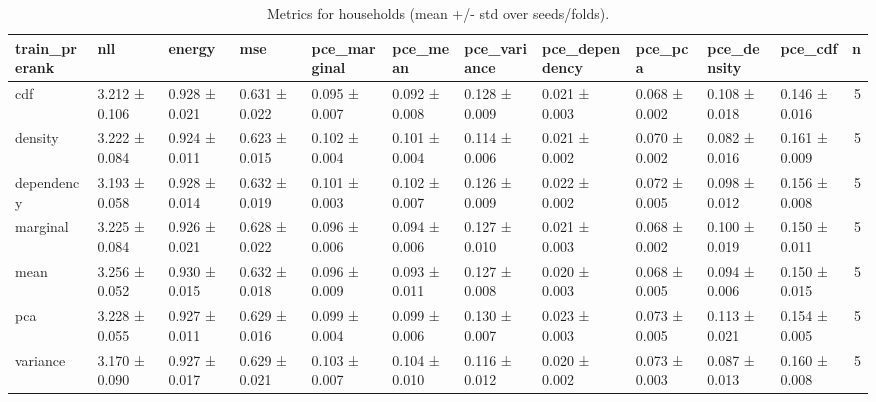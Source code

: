 \begin{table}
\caption{Metrics for households (mean +/- std over seeds/folds).}
\label{tab:metrics_summary_households}
\begin{tabular}{lllllllllllr}
\toprule
train_prerank & nll & energy & mse & pce_marginal & pce_mean & pce_variance & pce_dependency & pce_pca & pce_density & pce_cdf & n \\
\midrule
cdf & 3.212 ± 0.106 & 0.928 ± 0.021 & 0.631 ± 0.022 & 0.095 ± 0.007 & 0.092 ± 0.008 & 0.128 ± 0.009 & 0.021 ± 0.003 & 0.068 ± 0.002 & 0.108 ± 0.018 & 0.146 ± 0.016 & 5 \\
density & 3.222 ± 0.084 & 0.924 ± 0.011 & 0.623 ± 0.015 & 0.102 ± 0.004 & 0.101 ± 0.004 & 0.114 ± 0.006 & 0.021 ± 0.002 & 0.070 ± 0.002 & 0.082 ± 0.016 & 0.161 ± 0.009 & 5 \\
dependency & 3.193 ± 0.058 & 0.928 ± 0.014 & 0.632 ± 0.019 & 0.101 ± 0.003 & 0.102 ± 0.007 & 0.126 ± 0.009 & 0.022 ± 0.002 & 0.072 ± 0.005 & 0.098 ± 0.012 & 0.156 ± 0.008 & 5 \\
marginal & 3.225 ± 0.084 & 0.926 ± 0.021 & 0.628 ± 0.022 & 0.096 ± 0.006 & 0.094 ± 0.006 & 0.127 ± 0.010 & 0.021 ± 0.003 & 0.068 ± 0.002 & 0.100 ± 0.019 & 0.150 ± 0.011 & 5 \\
mean & 3.256 ± 0.052 & 0.930 ± 0.015 & 0.632 ± 0.018 & 0.096 ± 0.009 & 0.093 ± 0.011 & 0.127 ± 0.008 & 0.020 ± 0.003 & 0.068 ± 0.005 & 0.094 ± 0.006 & 0.150 ± 0.015 & 5 \\
pca & 3.228 ± 0.055 & 0.927 ± 0.011 & 0.629 ± 0.016 & 0.099 ± 0.004 & 0.099 ± 0.006 & 0.130 ± 0.007 & 0.023 ± 0.003 & 0.073 ± 0.005 & 0.113 ± 0.021 & 0.154 ± 0.005 & 5 \\
variance & 3.170 ± 0.090 & 0.927 ± 0.017 & 0.629 ± 0.021 & 0.103 ± 0.007 & 0.104 ± 0.010 & 0.116 ± 0.012 & 0.020 ± 0.002 & 0.073 ± 0.003 & 0.087 ± 0.013 & 0.160 ± 0.008 & 5 \\
\bottomrule
\end{tabular}
\end{table}
